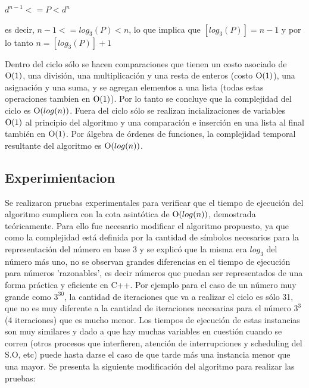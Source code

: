 	\newline
	$d^{n-1} <= P < d^n$

	\newline
	es decir, $n -1 <= log_3(P) < n$, lo que implica que $[log_3(P)] = n - 1$ y por lo tanto $n = [log_3(P)] + 1$


	Dentro del ciclo sólo se hacen comparaciones que tienen un costo asociado de $\operatorname{O}(1)$, una división, una multiplicación y una resta de enteros (costo $\operatorname{O}(1)$), una asignación y una suma, y se agregan elementos a una lista (todas estas operaciones tambien en $\operatorname{O}(1)$). Por lo tanto se concluye que la complejidad del ciclo es $\operatorname{O}(log(n))$. Fuera del ciclo sólo se realizan incializaciones de variables $\operatorname{O}(1)$ al principio del algoritmo y una comparación e inserción en una lista al final también en $\operatorname{O}(1)$. Por álgebra de órdenes de funciones, la complejidad temporal resultante del algoritmo es $\operatorname{O}(log(n))$. 


    \subsection{Experimientacion}
         

	Se realizaron pruebas experimentales para verificar que el tiempo de
	ejecución del algoritmo cumpliera con la cota asintótica de $\operatorname{O}(log(n))$,
	demostrada teóricamente. Para ello fue necesario modificar el algoritmo propuesto, ya que como la complejidad está definida por la cantidad de símbolos necesarios para la representación del número en base 3 y se explicó que la misma era $log_3$ del número más uno, no se observan grandes diferencias en el tiempo de ejecución para números 'razonables', es decir números que puedan ser representados de una forma práctica y eficiente en C++. Por ejemplo para el caso de un número muy grande como $3^{30}$, la cantidad de iteraciones que va a realizar el ciclo es sólo 31, que no es muy diferente a la cantidad de iteraciones necesarias para el número $3^{3}$ (4 iteraciones) que es mucho menor. Los tiempos de ejecución de estas instancias son muy similares y dado a que hay muchas variables en cuestión cuando se corren (otros procesos que interfieren, atención de interrupciones y scheduling del S.O, etc) puede hasta darse el caso de que tarde más una instancia menor que una mayor. Se presenta la siguiente modificación del algoritmo para realizar las pruebas:

